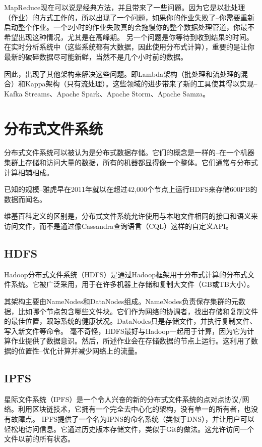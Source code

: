 \documentclass[degree=project,degree-type=project,cjk-font=noto]{thuthesis}
\begin{document}
MapReduce现在可以说是经典方法，并且带来了一些问题。因为它是以批处理（作业）的方式工作的，所以出现了一个问题，如果你的作业失败了--你需要重新启动整个作业。一个2小时的作业失败真的会拖慢你的整个数据处理管道，你最不希望出现这种情况，尤其是在高峰期。
另一个问题是你等待到收到结果的时间。在实时分析系统中（这些系统都有大数据，因此使用分布式计算），重要的是让你最新的破碎数据尽可能新鲜，当然不是几个小时前的数据。

因此，出现了其他架构来解决这些问题。即Lambda架构（批处理和流处理的混合）和Kappa架构（只有流处理）。这些领域的进步带来了新的工具使其得以实现--Kafka Streams、Apache Spark、Apache Storm、Apache Samza。

\chapter{分布式文件系统}

分布式文件系统可以被认为是分布式数据存储。它们的概念是一样的--在一个机器集群上存储和访问大量的数据，所有的机器都显得像一个整体。它们通常与分布式计算相辅相成。

已知的规模--雅虎早在2011年就以在超过42,000个节点上运行HDFS来存储600PB的数据而闻名。

维基百科定义的区别是，分布式文件系统允许使用与本地文件相同的接口和语义来访问文件，而不是通过像Cassandra查询语言（CQL）这样的自定义API。

\section{HDFS}

Hadoop分布式文件系统（HDFS）是通过Hadoop框架用于分布式计算的分布式文件系统。它被广泛采用，用于在许多机器上存储和复制大文件（GB或TB大小）。

其架构主要由NameNodes和DataNodes组成。NameNodes负责保存集群的元数据，比如哪个节点包含哪些文件块。它们作为网络的协调者，找出存储和复制文件的最佳位置，跟踪系统的健康状况。DataNodes只是存储文件，并执行复制文件、写入新文件等命令。
毫不奇怪，HDFS最好与Hadoop一起用于计算，因为它为计算作业提供了数据意识。然后，所述作业会在存储数据的节点上运行。这利用了数据的位置性--优化计算并减少网络上的流量。

\section{IPFS}

星际文件系统（IPFS）是一个令人兴奋的新的分布式文件系统的点对点协议/网络。利用区块链技术，它拥有一个完全去中心化的架构，没有单一的所有者，也没有故障点。
IPFS提供了一个名为IPNS的命名系统（类似于DNS），并让用户可以轻松地访问信息。它通过历史版本存储文件，类似于Git的做法。这允许访问一个文件以前的所有状态。
\end{document}
